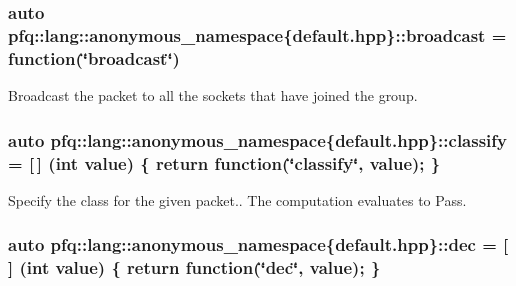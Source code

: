 \subsubsection[{\texorpdfstring{broadcast}{broadcast}}]{\setlength{\rightskip}{0pt plus 5cm}auto pfq\+::lang\+::anonymous\+\_\+namespace\{default.\+hpp\}\+::broadcast = {\bf function}(\char`\"{}broadcast\char`\"{})}\hypertarget{namespacepfq_1_1lang_1_1anonymous__namespace_02default_8hpp_03_ac9e0f3ad7fa32146565f4aaab709d19d}{}\label{namespacepfq_1_1lang_1_1anonymous__namespace_02default_8hpp_03_ac9e0f3ad7fa32146565f4aaab709d19d}


Broadcast the packet to all the sockets that have joined the group. 

\subsubsection[{\texorpdfstring{classify}{classify}}]{\setlength{\rightskip}{0pt plus 5cm}auto pfq\+::lang\+::anonymous\+\_\+namespace\{default.\+hpp\}\+::classify = \mbox{[}$\,$\mbox{]} (int value) \{ return {\bf function}(\char`\"{}classify\char`\"{}, value); \}}\hypertarget{namespacepfq_1_1lang_1_1anonymous__namespace_02default_8hpp_03_a4f0a980be076a3958156b7053ac06912}{}\label{namespacepfq_1_1lang_1_1anonymous__namespace_02default_8hpp_03_a4f0a980be076a3958156b7053ac06912}


Specify the class for the given packet.. The computation evaluates to {\ttfamily Pass}. 

\subsubsection[{\texorpdfstring{dec}{dec}}]{\setlength{\rightskip}{0pt plus 5cm}auto pfq\+::lang\+::anonymous\+\_\+namespace\{default.\+hpp\}\+::dec = \mbox{[}$\,$\mbox{]} (int value) \{ return {\bf function}(\char`\"{}dec\char`\"{}, value); \}}\hypertarget{namespacepfq_1_1lang_1_1anonymous__namespace_02default_8hpp_03_a139906841e77a2eb86b761b27ceeb685}{}\label{namespacepfq_1_1lang_1_1anonymous__namespace_02default_8hpp_03_a139906841e77a2eb86b761b27ceeb685}


